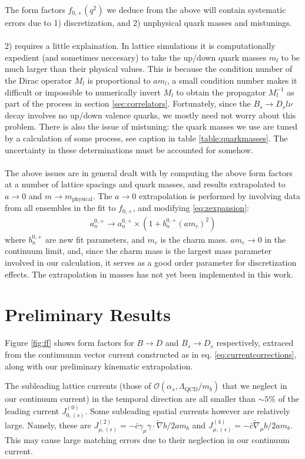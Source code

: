 The form factors $f_{0,+}(q^2)$ we deduce from the above will contain systematic errors due to 1) discretization, and 2) unphysical quark masses and mistunings. 
\\ \\
2) requires a little explaination. In lattice simulations it is computationally expedient (and sometimes neccesary) to take the up/down quark masses $m_l$ to be much larger than their physical values. This is because the condition number of the Dirac operator $M_l$ is proportional to $am_l$, a small condition number makes it difficult or impossible to numerically invert $M_l$ to obtain the propagator $M^{-1}_l$ as part of the process in section \ref{sec:correlators}. Fortunately, since the $B_s\to D_s l\nu$ decay involves no up/down valence quarks, we mostly need not worry about this problem. There is also the issue of mistuning: the quark masses we use are tuned by a calculation of some process, see caption in table \ref{table:quarkmasses}. The uncertainty in these determinations must be accounted for somehow.
\\ \\
The above issues are in general dealt with by computing the above form factors at a number of lattice spacings and quark masses, and results extrapolated to $a\to 0$ and $m\to m_{\text{physical}}$. The $a\to 0$ extrapolation is performed by involving data from all ensembles in the fit to $f_{0,+}$, and modifying \eqref{eq:zexpansion}:
\begin{align}
	a^{0,+}_n \to a^{0,+}_n \times ( 1 + b^{0,+}_n (am_c)^2 )
\end{align}
where $b^{0,+}_n$ are new fit parameters, and $m_c$ is the charm mass. $am_c\to0$ in the continuum limit, and, since the charm mass is the largest mass parameter involved in our calculation, it serves as a good order parameter for discretization effects. The extrapolation in masses has not yet been implemented in this work.
\section{Preliminary Results}
\label{sec:results}

Figure \ref{fig:ff} shows form factors for $B\to D$ and $B_s \to D_s$ respectively, extraced from the continuunm vector current constructed as in eq. \eqref{eq:currentcorrections}, along with our preliminary kinematic extrapolation.

The subleading lattice currents (those of $\mathcal{O}(\alpha_s,\Lambda_{\mathrm{QCD}}/m_b)$ that we neglect in our continuum current) in the temporal direction are all smaller than $\sim 5\%$ of the leading current $J^{(0)}_{0,{(s)}}$. Some subleading spatial currents however are relatively large. Namely, these are $J^{(2)}_{\mu,(s)} = - \bar{c}\gamma_\mu \gamma \cdot\overleftarrow{\nabla} b/2am_b$ and $J^{(4)}_{\mu,(s)} = - \bar{c} \overleftarrow{\nabla}_{\mu} b/2am_b$. This may cause large matching errors due to their neglection in our continuum current.

